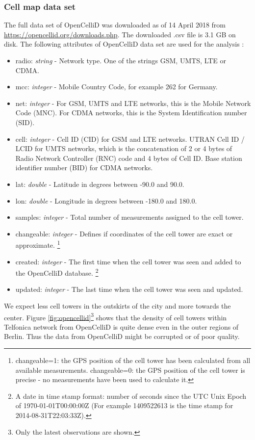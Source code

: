 \subsubsection{Cell map data set}
The full data set of OpenCelliD was downloaded as of 14 April 2018 from \url{https://opencellid.org/downloads.php}. The downloaded .csv file is 3.1 GB on disk. The following attributes of OpenCelliD data set are used for the analysis \cite{opencellid}:
\begin{itemize}
\item radio: \textit{string} - Network type. One of the strings GSM, UMTS, LTE or CDMA.
\item mcc:  \textit{integer}  -  Mobile Country Code, for example 262 for Germany.
\item net: \textit{integer} - For GSM, UMTS and LTE networks, this is the Mobile Network Code (MNC). For CDMA networks, this is the System Identification number (SID).
\item cell: \textit{integer} - Cell ID (CID) for GSM and LTE networks. UTRAN Cell ID / LCID for UMTS networks, which is the concatenation of 2 or 4 bytes of Radio Network Controller (RNC) code and 4 bytes of Cell ID. Base station identifier number (BID) for CDMA networks.
\item lat: \textit{double} - Latitude in degrees between -90.0 and 90.0.
\item lon: \textit{double} - Longitude in degrees between -180.0 and 180.0.
\item samples: \textit{integer} - Total number of measurements assigned to the cell tower.
\item changeable:  \textit{integer} - Defines if coordinates of the cell tower are exact or approximate. \footnote{changeable=1: the GPS position of the cell tower has been calculated from all available measurements. changeable=0: the GPS position of the cell tower is precise - no measurements have been used to calculate it.}
\item created: \textit{integer} - The first time when the cell tower was seen and added to the OpenCelliD database. \footnote{A date in time stamp format: number of seconds since the UTC Unix Epoch of 1970-01-01T00:00:00Z (For example 1409522613 is the time stamp for 2014-08-31T22:03:33Z).}
\item updated: \textit{integer} - The last time when the cell tower was seen and updated.
\end{itemize}

We expect less cell towers in the outskirts of the city and more towards the center. Figure \ref{fig:opencellid}\footnote{Only the latest observations are shown.} shows that the density of cell towers within Telfonica network from OpenCelliD is quite dense even in the outer regions of Berlin. Thus the data from OpenCelliD might be corrupted or of poor quality.

